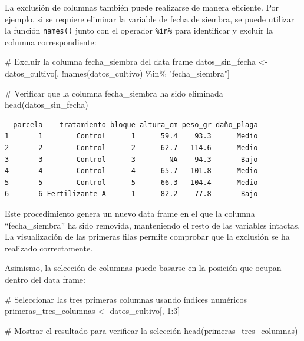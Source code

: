\documentclass[
  spanish,
  a4paper,
  DIV=11,
  numbers=noendperiod,
  onepage,
  openany]{scrreprt}
\newenvironment{Shaded}{\begin{snugshade}}{\end{snugshade}}
\newcommand{\CommentTok}[1]{\textcolor[rgb]{0.37,0.37,0.37}{#1}}
\newcommand{\DecValTok}[1]{\textcolor[rgb]{0.68,0.00,0.00}{#1}}
\newcommand{\FunctionTok}[1]{\textcolor[rgb]{0.28,0.35,0.67}{#1}}
\newcommand{\NormalTok}[1]{\textcolor[rgb]{0.00,0.23,0.31}{#1}}
\newcommand{\OtherTok}[1]{\textcolor[rgb]{0.00,0.23,0.31}{#1}}
\newcommand{\SpecialCharTok}[1]{\textcolor[rgb]{0.37,0.37,0.37}{#1}}
\newcommand{\StringTok}[1]{\textcolor[rgb]{0.13,0.47,0.30}{#1}}
\begin{document}
La exclusión de columnas también puede realizarse de manera eficiente.
Por ejemplo, si se requiere eliminar la variable de fecha de siembra, se
puede utilizar la función \texttt{names()} junto con el operador
\texttt{\%in\%} para identificar y excluir la columna correspondiente:

\begin{Shaded}
\begin{Highlighting}[]
\CommentTok{\# Excluir la columna fecha\_siembra del data frame}
\NormalTok{datos\_sin\_fecha }\OtherTok{\textless{}{-}}\NormalTok{ datos\_cultivo[, }\SpecialCharTok{!}\FunctionTok{names}\NormalTok{(datos\_cultivo)}
                                 \SpecialCharTok{\%in\%} \StringTok{"fecha\_siembra"}\NormalTok{]}

\CommentTok{\# Verificar que la columna fecha\_siembra ha sido eliminada}
\FunctionTok{head}\NormalTok{(datos\_sin\_fecha)}
\end{Highlighting}
\end{Shaded}

\begin{verbatim}
  parcela    tratamiento bloque altura_cm peso_gr daño_plaga
1       1        Control      1      59.4    93.3      Medio
2       2        Control      2      62.7   114.6      Medio
3       3        Control      3        NA    94.3       Bajo
4       4        Control      4      65.7   101.8      Medio
5       5        Control      5      66.3   104.4      Medio
6       6 Fertilizante A      1      82.2    77.8       Bajo
\end{verbatim}

Este procedimiento genera un nuevo data frame en el que la columna
``fecha\_siembra'' ha sido removida, manteniendo el resto de las
variables intactas. La visualización de las primeras filas permite
comprobar que la exclusión se ha realizado correctamente.

Asimismo, la selección de columnas puede basarse en la posición que
ocupan dentro del data frame:

\begin{Shaded}
\begin{Highlighting}[]
\CommentTok{\# Seleccionar las tres primeras columnas usando índices numéricos}
\NormalTok{primeras\_tres\_columnas }\OtherTok{\textless{}{-}}\NormalTok{ datos\_cultivo[, }\DecValTok{1}\SpecialCharTok{:}\DecValTok{3}\NormalTok{]}

\CommentTok{\# Mostrar el resultado para verificar la selección}
\FunctionTok{head}\NormalTok{(primeras\_tres\_columnas)}
\end{Highlighting}
\end{Shaded}
\end{document}
